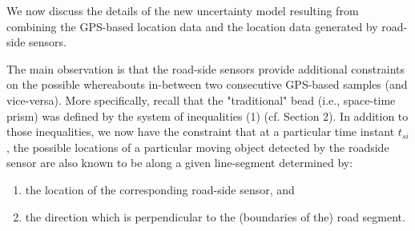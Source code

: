 We now discuss the details of the new uncertainty model resulting from combining
the GPS-based location data and the location data generated by road-side sensors.


The main observation is that the road-side sensors provide additional constraints on the possible whereabouts in-between
two consecutive GPS-based samples (and vice-versa). More specifically, recall that the "traditional" bead (i.e., space-time prism)
 was defined by the system of inequalities (1) (cf. Section 2). In addition to those inequalities, we now
 have the constraint that at a particular time instant $t_{si}$, the
possible locations of a particular moving object detected by the roadside sensor are also known to be along a
given line-segment determined by:
\begin{enumerate}

\item the location of the
corresponding road-side sensor, and

\item the direction which is perpendicular to the (boundaries of the)
road segment.

\end{enumerate}

